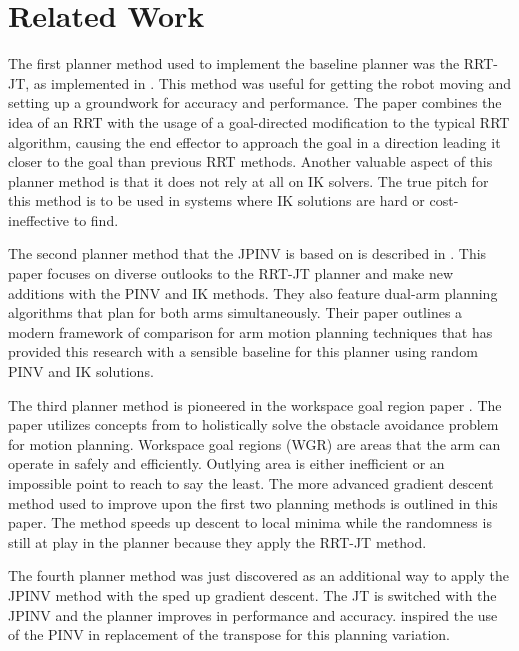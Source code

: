 \documentclass[conference]{IEEEtran} \usepackage[T1]{fontenc} \usepackage[backend=biber, style=ieee]{biblatex}
\begin{document}
\section{Related Work} \label{Related Work}

The first planner method used to implement the baseline planner was the RRT-JT, as implemented in \cite{random_planner_wo_ik}. This method was useful for getting the 
robot moving and setting up a groundwork for accuracy and performance. The paper combines the idea of an RRT with the usage of a goal-directed modification to 
the typical RRT algorithm, causing the end effector to approach the goal in a direction leading it closer to the goal than previous RRT methods. Another valuable 
aspect of this planner method is that it does not rely at all on IK solvers. The true pitch for this method is to be used in systems where IK solutions are hard 
or cost-ineffective to find.

The second planner method that the JPINV is based on is described in \cite{humanoid_motion_planning}. This paper focuses on diverse outlooks to the RRT-JT planner and 
make new additions with the PINV and IK methods. They also feature dual-arm planning algorithms that plan for both arms simultaneously. Their paper outlines a 
modern framework of comparison for arm motion planning techniques that has provided this research with a sensible baseline for this planner using random PINV and 
IK solutions.

The third planner method is pioneered in the workspace goal region paper \cite{wgr_planning}. The paper utilizes concepts from \cite{humanoid_motion_planning} to 
holistically solve the obstacle avoidance problem for motion planning. Workspace goal regions (WGR) are areas that the arm can operate in safely and efficiently. 
Outlying area is either inefficient or an impossible point to reach to say the least. The more advanced gradient descent method used to improve upon the first 
two planning methods is outlined in this paper. The method speeds up descent to local minima while the randomness is still at play in the planner because they 
apply the RRT-JT method.  

The fourth planner method was just discovered as an additional way to apply the JPINV method with the sped up gradient descent. The JT is switched with the 
JPINV and the planner improves in performance and accuracy. \cite{humanoid_motion_planning} inspired the use of the PINV in replacement of the transpose for this 
planning variation.
\end{document}
